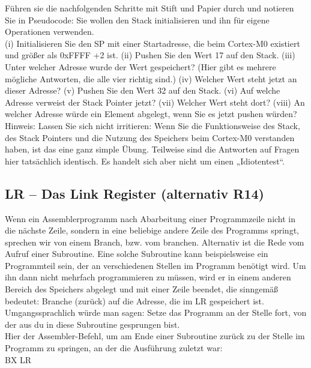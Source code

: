Führen sie die nachfolgenden Schritte mit Stift und Papier durch und notieren Sie in Pseudocode: Sie wollen den Stack initialisieren und ihn für eigene Operationen verwenden.\\

(i) Initialisieren Sie den SP mit einer Startadresse, die beim Cortex-M0 existiert und größer als 
0xFFFF +2 ist. 
(ii) Pushen Sie den Wert 17 auf den Stack.
(iii) Unter welcher Adresse wurde der Wert gespeichert? (Hier gibt es mehrere mögliche Antworten, die alle vier richtig sind.)
(iv) Welcher Wert steht jetzt an dieser Adresse?
(v) Pushen Sie den Wert 32 auf den Stack.
(vi) Auf welche Adresse verweist der Stack Pointer jetzt?
(vii) Welcher Wert steht dort?
(viii) An welcher Adresse würde ein Element abgelegt, wenn Sie es jetzt pushen würden?\\

Hinweis: Lassen Sie sich nicht irritieren: Wenn Sie die Funktionsweise des Stack, des Stack Pointers und die Nutzung des Speichers beim Cortex-M0 verstanden haben, ist das eine ganz simple Übung. Teilweise sind die Antworten auf Fragen hier tatsächlich identisch. Es handelt sich aber nicht um einen „Idiotentest“.\\

\subsection{LR – Das Link Register (alternativ R14)}
Wenn ein Assemblerprogramm nach Abarbeitung einer Programmzeile nicht in die nächste Zeile, sondern in eine beliebige andere Zeile des Programms springt, sprechen wir von einem Branch, bzw. vom branchen. Alternativ ist die Rede vom Aufruf einer Subroutine. Eine solche Subroutine kann beispielsweise ein Programmteil sein, der an verschiedenen Stellen im Programm benötigt wird. Um ihn dann nicht mehrfach programmieren zu müssen, wird er in einem anderen Bereich des Speichers abgelegt und mit einer Zeile beendet, die sinngemäß bedeutet: Branche (zurück) auf die Adresse, die im LR gespeichert ist. Umgangssprachlich würde man sagen: Setze das Programm an der Stelle fort, von der aus du in diese Subroutine gesprungen bist.\\

Hier der Assembler-Befehl, um am Ende einer Subroutine zurück zu der Stelle im Programm zu springen, an der die Ausführung zuletzt war:\\

BX LR\\

